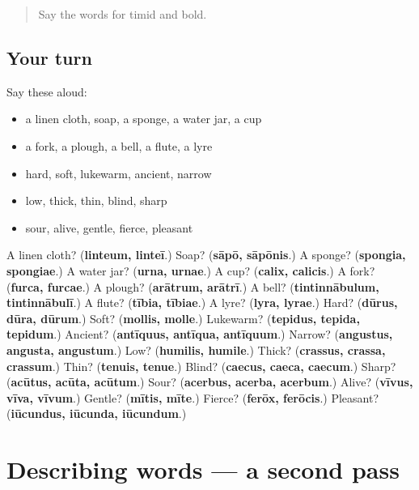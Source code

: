 \label{lesson:LA-R150-first-pass-people-and-describing-words}



\begin{quote}
Say the words for timid and bold.
\end{quote}

\subsection*{Your turn}
Say these aloud:

\begin{itemize}
\raggedright
  \item a linen cloth, soap, a sponge, a water jar, a cup
  \item a fork, a plough, a bell, a flute, a lyre
  \item hard, soft, lukewarm, ancient, narrow
  \item low, thick, thin, blind, sharp
  \item sour, alive, gentle, fierce, pleasant
\end{itemize}

\begin{tcolorbox}[breakable,colback=teal!4,colframe=teal!35!black,title={Before you move on}]
A linen cloth? (\textbf{linteum, linteī}.) Soap? (\textbf{sāpō, sāpōnis}.) A sponge? (\textbf{spongia, spongiae}.) A water jar? (\textbf{urna, urnae}.) A cup? (\textbf{calix, calicis}.) A fork? (\textbf{furca, furcae}.) A plough? (\textbf{arātrum, arātrī}.) A bell? (\textbf{tintinnābulum, tintinnābulī}.) A flute? (\textbf{tībia, tībiae}.) A lyre? (\textbf{lyra, lyrae}.) Hard? (\textbf{dūrus, dūra, dūrum}.) Soft? (\textbf{mollis, molle}.) Lukewarm? (\textbf{tepidus, tepida, tepidum}.) Ancient? (\textbf{antīquus, antīqua, antīquum}.) Narrow? (\textbf{angustus, angusta, angustum}.) Low? (\textbf{humilis, humile}.) Thick? (\textbf{crassus, crassa, crassum}.) Thin? (\textbf{tenuis, tenue}.) Blind? (\textbf{caecus, caeca, caecum}.) Sharp? (\textbf{acūtus, acūta, acūtum}.) Sour? (\textbf{acerbus, acerba, acerbum}.) Alive? (\textbf{vīvus, vīva, vīvum}.) Gentle? (\textbf{mītis, mīte}.) Fierce? (\textbf{ferōx, ferōcis}.) Pleasant? (\textbf{iūcundus, iūcunda, iūcundum}.)
\end{tcolorbox}
\section[(dialogue)]{Describing words — a second pass}

\label{lesson:LA-R150-second-pass-describing-words}



